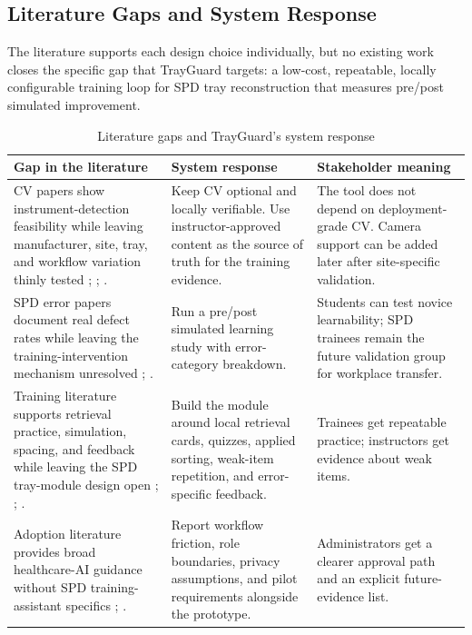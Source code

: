 \documentclass[10pt,a4paper]{article}
\begin{document}
\subsection{Literature Gaps and System Response}


The literature supports each design choice individually, but no existing work
closes the specific gap that TrayGuard targets: a low-cost, repeatable,
locally configurable training loop for SPD tray reconstruction that measures
pre/post simulated improvement.
\begin{table}[H]
\centering
\caption{Literature gaps and TrayGuard's system response}
\label{tab:literature-gaps-and-system-response}
\small\renewcommand{\arraystretch}{1.2}\setlength{\tabcolsep}{4pt}
\begin{tabularx}{\textwidth}{|>{\raggedright\arraybackslash}X|>{\raggedright\arraybackslash}X|>{\raggedright\arraybackslash}X|}
\hline
Gap in the literature & System response & Stakeholder meaning \\
\hline
CV papers show instrument-detection feasibility while leaving manufacturer, site, tray, and workflow variation thinly tested \cite{deol-et-al-2024}; \cite{atabuzzaman-et-al-2025}; \cite{kienle-et-al-2025}. & Keep CV optional and locally verifiable. Use instructor-approved content as the source of truth for the training evidence. & The tool does not depend on deployment-grade CV. Camera support can be added later after site-specific validation. \\
\hline
SPD error papers document real defect rates while leaving the training-intervention mechanism unresolved \cite{alfred-et-al-2021}; \cite{nichol-et-al-2024}. & Run a pre/post simulated learning study with error-category breakdown. & Students can test novice learnability; SPD trainees remain the future validation group for workplace transfer. \\
\hline
Training literature supports retrieval practice, simulation, spacing, and feedback while leaving the SPD tray-module design open \cite{roediger-and-karpicke-2006}; \cite{cook-et-al-2011}; \cite{ofstead-et-al-2023}. & Build the module around local retrieval cards, quizzes, applied sorting, weak-item repetition, and error-specific feedback. & Trainees get repeatable practice; instructors get evidence about weak items. \\
\hline
Adoption literature provides broad healthcare-AI guidance without SPD training-assistant specifics \cite{goddard-et-al-2012}; \cite{kelly-2026}. & Report workflow friction, role boundaries, privacy assumptions, and pilot requirements alongside the prototype. & Administrators get a clearer approval path and an explicit future-evidence list. \\
\hline
\end{tabularx}
\end{table}
\end{document}
